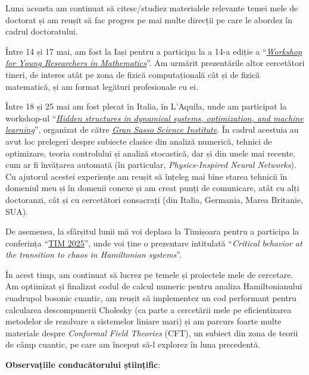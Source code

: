 
\makereportpreamble

\vspace{0.5em}

Luna aceasta am continuat să citesc/studiez materialele relevante temei mele de doctorat și am reușit să fac progres pe mai multe direcții pe care le abordez în cadrul doctoratului.

Între 14 și 17 mai, am fost la Iași pentru a participa la a 14-a ediție a ``\href{https://fmi.univ-ovidius.ro/en/cercetare/wyrm2025/}{\textit{Workshop for Young Researchers in Mathematics}}''. Am urmărit prezentările altor cercetători tineri, de interes atât pe zona de fizică computațională cât și de fizică matematică, și am format legături profesionale cu ei.

Între 18 și 25 mai am fost plecat în Italia, în L'Aquila, unde am participat la workshop-ul ``\href{https://trimester2025.math.gssi.it/workshop4/}{\textit{Hidden structures in dynamical systems, optimization, and machine learning}}'', organizat de către \href{https://gssi.it/}{\textit{Gran Sasso Science Institute}}. În cadrul acestuia au avut loc prelegeri despre subiecte clasice din analiză numerică, tehnici de optimizare, teoria controlului și analiză stocastică, dar și din unele mai recente, cum ar fi învățarea automată (în particular, \emph{Physics-Inspired Neural Networks}). Cu ajutorul acestei experiențe am reușit să înțeleg mai bine starea tehnicii în domeniul meu și în domenii conexe și am creat punți de comunicare, atât cu alți doctoranzi, cât și cu cercetători consacrați (din Italia, Germania, Marea Britanie, SUA).

De asemenea, la sfârșitul lunii mă voi deplasa la Timișoara pentru a participa la conferința ``\href{https://timconference.uvt.ro/}{TIM 2025}'', unde voi ține o prezentare intitulată ``\textit{Critical behavior at the transition to chaos in Hamiltonian systems}''.

În acest timp, am continuat să lucrez pe temele și proiectele mele de cercetare. Am optimizat și finalizat codul de calcul numeric pentru analiza Hamiltonianului cuadrupol bosonic cuantic, am reușit să implementez un cod performant pentru calcularea descompunerii Cholesky (ca parte a cercetării mele pe eficientizarea metodelor de rezolvare a sistemelor liniare mari) și am parcurs foarte multe materiale despre \emph{Conformal Field Theories} (CFT), un subiect din zona de teorii de câmp cuantic, pe care am început să-l explorez în luna precedentă.

\textbf{Observațiile conducătorului științific}:

\vspace{3em}

